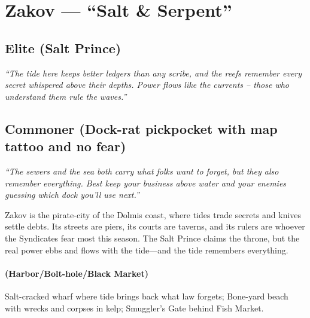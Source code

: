 \section{Zakov --- ``Salt \& Serpent''}
\label{chap:zakov}

\subsection*{Elite (Salt Prince)}
\textit{``The tide here keeps better ledgers than any scribe, and the reefs remember every secret whispered above their depths. Power flows like the currents – those who understand them rule the waves.''}

\subsection*{Commoner (Dock-rat pickpocket with map tattoo and no fear)}
\textit{``The sewers and the sea both carry what folks want to forget, but they also remember everything. Best keep your business above water and your enemies guessing which dock you'll use next.''}

\begin{tcolorbox}[colback=black!3,colframe=black!40!white,title={Theme \& Atmosphere}]
Zakov is the pirate-city of the Dolmis coast, where tides trade secrets and knives settle debts. Its streets are piers, its courts are taverns, and its rulers are whoever the Syndicates fear most this season. The Salt Prince claims the throne, but the real power ebbs and flows with the tide---and the tide remembers everything.
\end{tcolorbox}

\paragraph*{(Harbor/Bolt-hole/Black Market)} Salt-cracked wharf where tide brings back what law forgets; Bone-yard beach with wrecks and corpses in kelp; Smuggler's Gate behind Fish Market.

